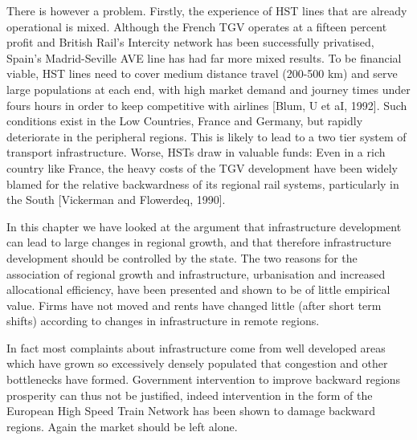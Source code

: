 There is however a problem. Firstly, the experience of HST lines that are already operational is mixed. Although the French TGV operates at a fifteen percent profit and British Rail's Intercity network has been successfully privatised, Spain's Madrid-Seville AVE line has had far more mixed results. To be financial viable, HST lines need to cover medium distance travel (200-500 km) and serve large populations at each end, with high market demand and journey times under fours hours in order to keep competitive with airlines [Blum, U et aI, 1992]. Such conditions exist in the Low Countries, France and Germany, but rapidly deteriorate in the peripheral regions. This is likely to lead to a two tier system of transport infrastructure. Worse, HSTs draw in valuable funds: Even in a rich country like France, the heavy costs of the TGV development have been widely blamed for the relative backwardness of its regional rail systems, particularly in the South [Vickerman and Flowerdeq, 1990].

In this chapter we have looked at the argument that infrastructure development can lead to large changes in regional growth, and that therefore infrastructure development should be controlled by the state. The two reasons for the association of regional growth and infrastructure, urbanisation and increased allocational efficiency, have been presented and shown to be of little empirical value. Firms have not moved and rents have changed little (after short term shifts) according to changes in infrastructure in remote regions.

In fact most complaints about infrastructure come from well developed areas which have grown so excessively densely populated that congestion and other bottlenecks have formed. Government intervention to improve backward regions prosperity can thus not be justified, indeed intervention in the form of the European High Speed Train Network has been shown to damage backward regions. Again the market should be left alone.